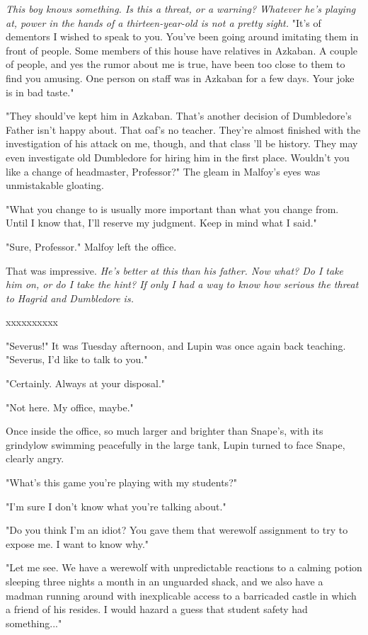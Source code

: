 \documentclass[a4paper,11pt]{article}
\begin{document}
\emph{This boy knows something. Is this a threat, or a warning? Whatever he's playing at, power in the hands of a thirteen-year-old is not a pretty sight.} "It's of dementors I wished to speak to you. You've been going around imitating them in front of people. Some members of this house have relatives in Azkaban. A couple of people, and yes the rumor about me is true, have been too close to them to find you amusing. One person on staff was in Azkaban for a few days. Your joke is in bad taste."

"They should've kept him in Azkaban. That's another decision of Dumbledore's Father isn't happy about. That oaf's no teacher. They're almost finished with the investigation of his attack on me, though, and that class 'll be history. They may even investigate old Dumbledore for hiring him in the first place. Wouldn't you like a change of headmaster, Professor?" The gleam in Malfoy's eyes was unmistakable gloating.

"What you change to is usually more important than what you change from. Until I know that, I'll reserve my judgment. Keep in mind what I said."

"Sure, Professor." Malfoy left the office.

That was impressive. \emph{He's better at this than his father. Now what? Do I take him on, or do I take the hint? If only I had a way to know how serious the threat to Hagrid and Dumbledore is.}

xxxxxxxxxx

"Severus!" It was Tuesday afternoon, and Lupin was once again back teaching. "Severus, I'd like to talk to you."

"Certainly. Always at your disposal."

"Not here. My office, maybe."

Once inside the office, so much larger and brighter than Snape's, with its grindylow swimming peacefully in the large tank, Lupin turned to face Snape, clearly angry.

"What's this game you're playing with my students?"

"I'm sure I don't know what you're talking about."

"Do you think I'm an idiot? You gave them that werewolf assignment to try to expose me. I want to know why."

"Let me see. We have a werewolf with unpredictable reactions to a calming potion sleeping three nights a month in an unguarded shack, and we also have a madman running around with inexplicable access to a barricaded castle in which a friend of his resides. I would hazard a guess that student safety had something..."
\end{document}
